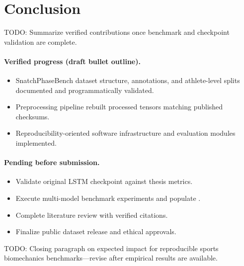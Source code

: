 \section{Conclusion}
\label{sec:conclusion}

\textsc{TODO:} Summarize verified contributions once benchmark and checkpoint validation are complete.

\paragraph{Verified progress (draft bullet outline).}
\begin{itemize}
  \item SnatchPhaseBench dataset structure, annotations, and athlete-level splits documented and programmatically validated.
  \item Preprocessing pipeline rebuilt processed tensors matching published checksums.
  \item Reproducibility-oriented software infrastructure and evaluation modules implemented.
\end{itemize}

\paragraph{Pending before submission.}
\begin{itemize}
  \item Validate original \acs{LSTM} checkpoint against thesis metrics.
  \item Execute multi-model benchmark experiments and populate .
  \item Complete literature review with verified citations.
  \item Finalize public dataset release and ethical approvals.
\end{itemize}

\textsc{TODO:} Closing paragraph on expected impact for reproducible sports biomechanics benchmarks—revise after empirical results are available.
